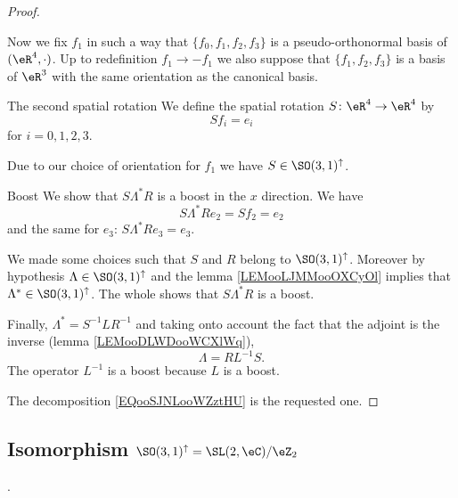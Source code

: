 \begin{proof}
\begin{subproof}
\begin{equation}
            \end{equation}
            Now we fix \( f_1\) in such a way that \( \{ f_0,f_1,f_2,f_3 \}\) is a pseudo-orthonormal basis of \( (\eR^4,\cdot)\). Up to redefinition \( f_1\to -f_1\) we also suppose that \( \{ f_1,f_2,f_3 \}\) is a basis of \( \eR^3\) with the same orientation as the canonical basis.
        \item[The second spatial rotation]
            We define the spatial rotation \( S\colon \eR^4\to \eR^4\) by
            \begin{equation}
                Sf_i=e_i
            \end{equation}
            for \( i=0,1,2,3\).

            Due to our choice of orientation for \( f_1\) we have \( S\in \SO(3,1)^{\uparrow}\).
        \item[Boost]
            We show that \( S\Lambda^*R\) is a boost in the \( x\) direction. We have
            \begin{equation}
                S\Lambda^*Re_2=Sf_2=e_2
            \end{equation}
            and the same for \( e_3\): \( S\Lambda^*Re_3=e_3\).

            We made some choices such that \( S\) and \( R\) belong to \( \SO(3,1)^{\uparrow}\). Moreover by hypothesis \( \Lambda\in \SO(3,1)^{\uparrow}\) and the lemma \ref{LEMooLJMMooOXCyOl} implies that \( \Lambda^*\in \SO(3,1)^{\uparrow}\). The whole shows that \( S\Lambda^*R\) is a boost.

            Finally, \( \Lambda^*=S^{-1}LR^{-1}\) and taking onto account the fact that the adjoint is the inverse (lemma \ref{LEMooDLWDooWCXlWq}),
            \begin{equation}        \label{EQooSJNLooWZztHU}
                \Lambda=RL^{-1}S.
            \end{equation}
            The operator \( L^{-1}\) is a boost because \( L\) is a boost.
    \end{subproof}
    The decomposition \eqref{EQooSJNLooWZztHU} is the requested one.
\end{proof}

\subsection{Isomorphism $\SO(3,1)^{\uparrow}= \SL(2,\eC)/ \eZ_2 $}.

